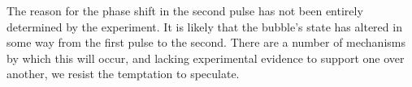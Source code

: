 The reason for the phase shift in the second pulse has not been entirely determined
by the experiment.  It is likely that the bubble's state has altered 
in some way from the first pulse to the second.
There are a number of mechanisms by which this will occur,
and lacking experimental evidence to support one over another,
we resist the temptation to speculate.



\clearpage














